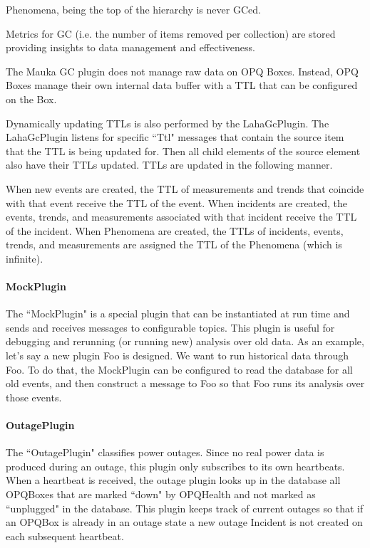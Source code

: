 Phenomena, being the top of the hierarchy is never GCed.

Metrics for GC (i.e. the number of items removed per collection) are stored providing insights to data management and effectiveness. 

The Mauka GC plugin does not manage raw data on OPQ Boxes. Instead, OPQ Boxes manage their own internal data buffer with a TTL that can be configured on the Box.

Dynamically updating TTLs is also performed by the LahaGcPlugin. The LahaGcPlugin listens for specific ``Ttl" messages that contain the source item that the TTL is being updated for. Then all child elements of the source element also have their TTLs updated. TTLs are updated in the following manner.

When new events are created, the TTL of measurements and trends that coincide with that event receive the TTL of the event. When incidents are created, the events, trends, and measurements associated with that incident receive the TTL of the incident. When Phenomena are created, the TTLs of incidents, events, trends, and measurements are assigned the TTL of the Phenomena (which is infinite).

\paragraph{MockPlugin}
The ``MockPlugin" is a special plugin that can be instantiated at run time and sends and receives messages to configurable topics. This plugin is useful for debugging and rerunning (or running new) analysis over old data. As an example, let's say a new plugin Foo is designed. We want to run historical data through Foo. To do that, the MockPlugin can be configured to read the database for all old events, and then construct a message to Foo so that Foo runs its analysis over those events.

\paragraph{OutagePlugin}
The ``OutagePlugin" classifies power outages. Since no real power data is produced during an outage, this plugin only subscribes to its own heartbeats. When a heartbeat is received, the outage plugin looks up in the database all OPQBoxes that are marked ``down" by OPQHealth and not marked as ``unplugged" in the database. This plugin keeps track of current outages so that if an OPQBox is already in an outage state a new outage Incident is not created on each subsequent heartbeat.

